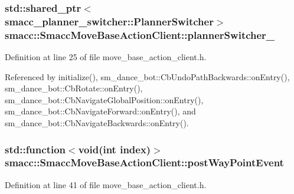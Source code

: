 \subsubsection[{\texorpdfstring{planner\+Switcher\+\_\+}{plannerSwitcher_}}]{\setlength{\rightskip}{0pt plus 5cm}std\+::shared\+\_\+ptr$<${\bf smacc\+\_\+planner\+\_\+switcher\+::\+Planner\+Switcher}$>$ smacc\+::\+Smacc\+Move\+Base\+Action\+Client\+::planner\+Switcher\+\_\+}\hypertarget{classsmacc_1_1SmaccMoveBaseActionClient_ae24164268108abf0b35cf51bfba5ec67}{}\label{classsmacc_1_1SmaccMoveBaseActionClient_ae24164268108abf0b35cf51bfba5ec67}


Definition at line 25 of file move\+\_\+base\+\_\+action\+\_\+client.\+h.



Referenced by initialize(), sm\+\_\+dance\+\_\+bot\+::\+Cb\+Undo\+Path\+Backwards\+::on\+Entry(), sm\+\_\+dance\+\_\+bot\+::\+Cb\+Rotate\+::on\+Entry(), sm\+\_\+dance\+\_\+bot\+::\+Cb\+Navigate\+Global\+Position\+::on\+Entry(), sm\+\_\+dance\+\_\+bot\+::\+Cb\+Navigate\+Forward\+::on\+Entry(), and sm\+\_\+dance\+\_\+bot\+::\+Cb\+Navigate\+Backwards\+::on\+Entry().

\subsubsection[{\texorpdfstring{post\+Way\+Point\+Event}{postWayPointEvent}}]{\setlength{\rightskip}{0pt plus 5cm}std\+::function$<$void(int index)$>$ smacc\+::\+Smacc\+Move\+Base\+Action\+Client\+::post\+Way\+Point\+Event\hspace{0.3cm}{\ttfamily [private]}}\hypertarget{classsmacc_1_1SmaccMoveBaseActionClient_a55a31bf13bb695a8bf5995000658d010}{}\label{classsmacc_1_1SmaccMoveBaseActionClient_a55a31bf13bb695a8bf5995000658d010}


Definition at line 41 of file move\+\_\+base\+\_\+action\+\_\+client.\+h.

